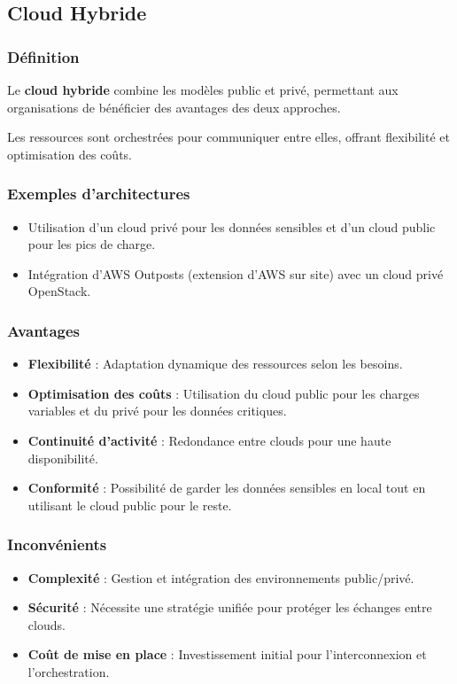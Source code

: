 \documentclass{report} %
\begin{document}
\subsection{Cloud Hybride}

\subsubsection{Définition}
Le \textbf{cloud hybride} combine les modèles public et privé,
permettant aux organisations de bénéficier des avantages des deux
approches.

Les ressources sont orchestrées pour communiquer entre elles, offrant
flexibilité et optimisation des coûts.

\subsubsection{Exemples d’architectures}
\begin{itemize}
    \item Utilisation d’un cloud privé pour les données sensibles et d’un cloud public pour les pics de charge.
    \item Intégration d’AWS Outposts (extension d’AWS sur site) avec un cloud privé OpenStack.
\end{itemize}

\subsubsection{Avantages}
\begin{itemize}
    \item \textbf{Flexibilité} : Adaptation dynamique des ressources selon les besoins.
    \item \textbf{Optimisation des coûts} : Utilisation du cloud public pour les charges variables et du privé pour les données critiques.
    \item \textbf{Continuité d’activité} : Redondance entre clouds pour une haute disponibilité.
    \item \textbf{Conformité} : Possibilité de garder les données sensibles en local tout en utilisant le cloud public pour le reste.
\end{itemize}

\subsubsection{Inconvénients}
\begin{itemize}
    \item \textbf{Complexité} : Gestion et intégration des environnements public/privé.
    \item \textbf{Sécurité} : Nécessite une stratégie unifiée pour protéger les échanges entre clouds.
    \item \textbf{Coût de mise en place} : Investissement initial pour l’interconnexion et l’orchestration.
\end{itemize}
\end{document}
